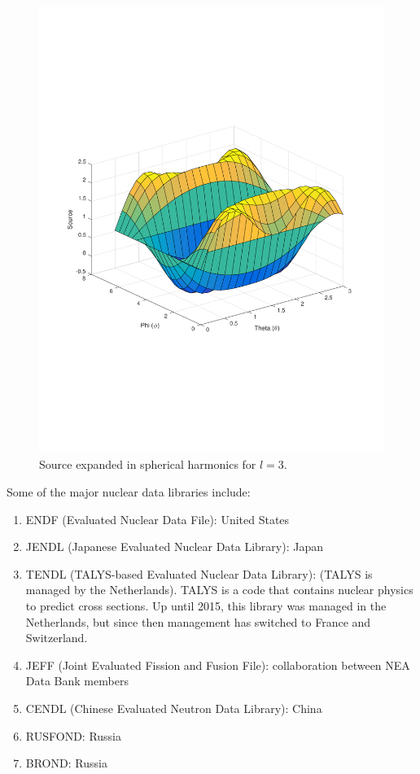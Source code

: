\documentclass[10pt]{article}
\newcommand*\circled[1]{\tikz[baseline=(char.base)]{
            \node[shape=circle,draw,inner sep=2pt] (char) {#1};}}
\begin{document}
\begin{figure}[H]
  \centering
  \includegraphics[width=15cm]{l_3.pdf}
  \caption{Source expanded in spherical harmonics for \(l=3\).}
  \label{fig:three}
\end{figure}

\clearpage
\circled{5} Some of the major nuclear data libraries include:

\begin{enumerate}
\item ENDF (Evaluated Nuclear Data File): United States
\item JENDL (Japanese Evaluated Nuclear Data Library): Japan
\item TENDL (TALYS-based Evaluated Nuclear Data Library): (TALYS is managed by the Netherlands). TALYS is a code that contains nuclear physics to predict cross sections. Up until 2015, this library was managed in the Netherlands, but since then management has switched to France and Switzerland.
\item JEFF (Joint Evaluated Fission and Fusion File): collaboration between NEA Data Bank members
\item CENDL (Chinese Evaluated Neutron Data Library): China
\item RUSFOND: Russia
\item BROND: Russia
\end{enumerate}
\end{document}

